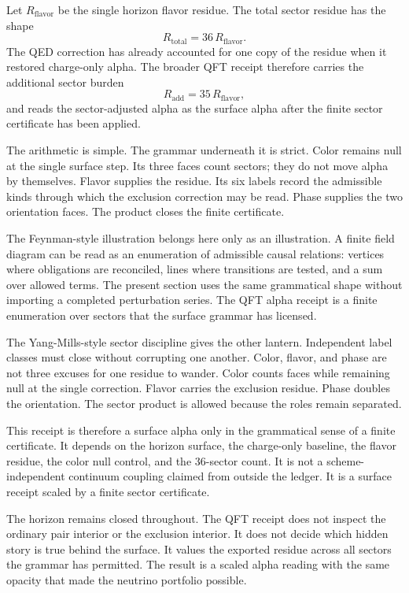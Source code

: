 Let \(R_{\mathrm{flavor}}\) be the single horizon flavor residue. The total
sector residue has the shape
\[
  R_{\mathrm{total}} = 36\,R_{\mathrm{flavor}}.
\]
The QED correction has already accounted for one copy of the residue when
it restored charge-only alpha. The broader QFT receipt therefore carries the
additional sector burden
\[
  R_{\mathrm{add}} = 35\,R_{\mathrm{flavor}},
\]
and reads the sector-adjusted alpha as the surface alpha after the finite
sector certificate has been applied.

The arithmetic is simple. The grammar underneath it is strict. Color remains
null at the single surface step. Its three faces count sectors; they do not
move alpha by themselves. Flavor supplies the residue. Its six labels
record the admissible kinds through which the exclusion correction may be
read. Phase supplies the two orientation faces. The product closes the
finite certificate.

The Feynman-style illustration belongs here only as an illustration. A
finite field diagram can be read as an enumeration of admissible causal
relations: vertices where obligations are reconciled, lines where
transitions are tested, and a sum over allowed terms. The present section
uses the same grammatical shape without importing a completed perturbation
series. The QFT alpha receipt is a finite enumeration over sectors that the
surface grammar has licensed.

The Yang-Mills-style sector discipline gives the other lantern. Independent
label classes must close without corrupting one another. Color, flavor, and
phase are not three excuses for one residue to wander. Color counts faces
while remaining null at the single correction. Flavor carries the
exclusion residue. Phase doubles the orientation. The sector product is
allowed because the roles remain separated.

This receipt is therefore a surface alpha only in the grammatical sense of a
finite certificate. It depends on the horizon surface, the charge-only
baseline, the flavor residue, the color null control, and the \(36\)-sector
count. It is not a scheme-independent continuum coupling claimed from
outside the ledger. It is a surface receipt scaled by a finite sector
certificate.

The horizon remains closed throughout. The QFT receipt does not inspect the
ordinary pair interior or the exclusion interior. It does not decide which
hidden story is true behind the surface. It values the exported residue
across all sectors the grammar has permitted. The result is a scaled alpha
reading with the same opacity that made the neutrino portfolio possible.

